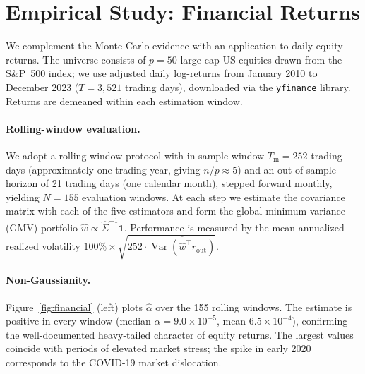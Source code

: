 \documentclass[10pt,twoside,titlepage]{article}
\begin{document}
\clearpage

\section{Empirical Study: Financial Returns}\label{sec-financial}

We complement the Monte Carlo evidence with an application to daily equity returns.
The universe consists of $p = 50$ large-cap US equities drawn from the S\&P~500 index;
we use adjusted daily log-returns from January 2010 to December 2023
($T = 3{,}521$ trading days), downloaded via the \texttt{yfinance} library.
Returns are demeaned within each estimation window.

\paragraph{Rolling-window evaluation.}
We adopt a rolling-window protocol with in-sample window $T_{\mathrm{in}} = 252$ trading
days (approximately one trading year, giving $n/p \approx 5$) and an out-of-sample
horizon of 21 trading days (one calendar month), stepped forward monthly, yielding
$N = 155$ evaluation windows.
At each step we estimate the covariance matrix with each of the five estimators and form
the global minimum variance (GMV) portfolio $\hat{w} \propto \hat{\Sigma}^{-1}\mathbf{1}$.
Performance is measured by the mean annualized realized volatility
$100\% \times \sqrt{252 \cdot \overline{\operatorname{Var}(\hat{w}^{\!\top} r_{\mathrm{out}})}}$.

\paragraph{Non-Gaussianity.}
Figure~\ref{fig:financial} (left) plots $\hat{\alpha}$ over the 155 rolling windows.
The estimate is positive in every window (median $\hat{\alpha} = 9.0 \times 10^{-5}$,
mean $6.5 \times 10^{-4}$), confirming the well-documented heavy-tailed character of
equity returns.
The largest values coincide with periods of elevated market stress; the spike in early 2020
corresponds to the COVID-19 market dislocation.
\end{document}
